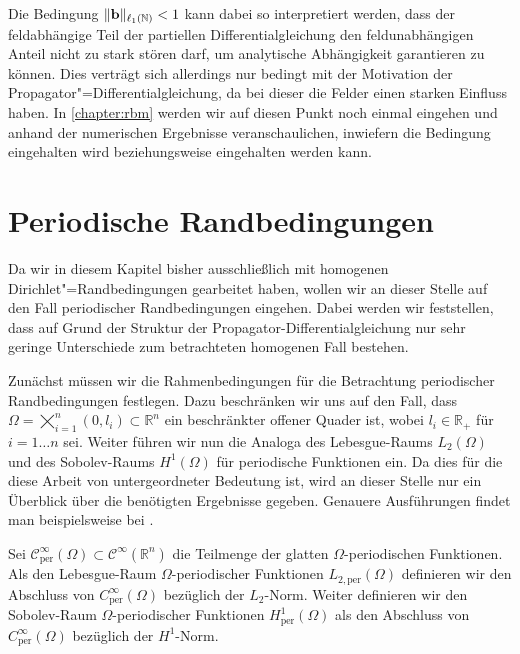 \documentclass[../main.tex]{subfiles}
\begin{document}
Die Bedingung $\lVert\mathbf{b}\rVert_{\ell_{1}(\mathbb{N})} < 1$ kann dabei so interpretiert werden, dass der feldabhängige Teil der partiellen Differentialgleichung den feldunabhängigen Anteil nicht zu stark stören darf, um analytische Abhängigkeit garantieren zu können.
Dies verträgt sich allerdings nur bedingt mit der Motivation der Propagator"=Differentialgleichung, da bei dieser die Felder einen starken Einfluss haben.
In \cref{chapter:rbm} werden wir auf diesen Punkt noch einmal eingehen und anhand der numerischen Ergebnisse veranschaulichen, inwiefern die Bedingung eingehalten wird beziehungsweise eingehalten werden kann.

\section{Periodische Randbedingungen} %
\label{section:periodische_randbedingungen}

Da wir in diesem Kapitel bisher ausschließlich mit homogenen Dirichlet"=Randbedingungen gearbeitet haben, wollen wir an dieser Stelle auf den Fall periodischer Randbedingungen eingehen.
Dabei werden wir feststellen, dass auf Grund der Struktur der Propagator-Differentialgleichung nur sehr geringe Unterschiede zum betrachteten homogenen Fall bestehen.

Zunächst müssen wir die Rahmenbedingungen für die Betrachtung periodischer Randbedingungen festlegen.
Dazu beschränken wir uns auf den Fall, dass $\Omega = \bigtimes_{i = 1}^{n} (0, l_{i}) \subset \mathbb{R}^{n}$ ein beschränkter offener Quader ist, wobei $l_{i} \in \mathbb{R}_{+}$ für $i = 1 \dots n$ sei.
Weiter führen wir nun die Analoga des Lebesgue-Raums $L_{2}(\Omega)$ und des Sobolev-Raums $H^{1}(\Omega)$ für periodische Funktionen ein.
Da dies für die diese Arbeit von untergeordneter Bedeutung ist, wird an dieser Stelle nur ein Überblick über die benötigten Ergebnisse gegeben.
Genauere Ausführungen findet man beispielsweise bei \textcite{Han2009}.

\begin{Definition}
\label{definition:periodische_sobolev_raeume}
    Sei $\mathcal C_{\mathrm{per}}^{\infty}(\Omega) \subset \mathcal C^{\infty}(\mathbb{R}^{n})$ die Teilmenge der glatten $\Omega$-periodischen Funktionen.
    Als den Lebesgue-Raum $\Omega$-periodischer Funktionen $L_{2,\mathrm{per}}(\Omega)$  definieren wir den Abschluss von $C_{\mathrm{per}}^{\infty}(\Omega)$ bezüglich der $L_{2}$-Norm.
    Weiter definieren wir den Sobolev-Raum $\Omega$-periodischer Funktionen $H^{1}_{\mathrm{per}}(\Omega)$ als den Abschluss von $C_{\mathrm{per}}^{\infty}(\Omega)$ bezüglich der $H^{1}$-Norm.
\end{Definition}
\end{document}
